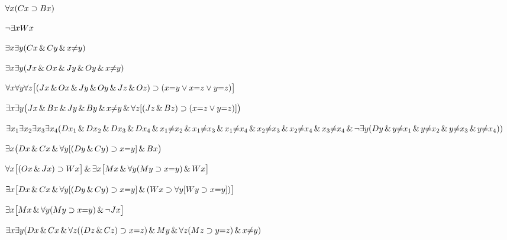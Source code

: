 \begin{earg}
\item %
$\forall x(Cx \supset Bx)$
\item %
$\neg\exists x Wx$
\item %
$\exists x \exists y(Cx \,\&\, Cy \,\&\, x{\neq} y)$
\item %
$\exists x \exists y(Jx \,\&\, Ox \,\&\, Jy \,\&\, Oy \,\&\, x{\neq} y)$
\item %
$\forall x\forall y\forall z\bigl[(Jx \,\&\, Ox \,\&\, Jy \,\&\, Oy \,\&\, Jz \,\&\, Oz)\supset(x{=}y \vee x{=}z \vee y{=}z)\bigr]$
\item %
$\exists x\exists y\bigl(Jx \,\&\, Bx \,\&\, Jy \,\&\, By \,\&\, x {\neq} y\,\&\, \forall z[(Jz \,\&\, Bz) \supset (x{=}z \vee y{=}z)]\bigr)$
\item %
$\exists x_1\exists x_2\exists x_3\exists x_4 (Dx_1 \,\&\, Dx_2 \,\&\, Dx_3 \,\&\, Dx_4 \,\&\, x_1 {\neq} x_2 \,\&\, x_1 {\neq} x_3 \,\&\, x_1 {\neq} x_4 \,\&\, x_2 {\neq} x_3 \,\&\, x_2 {\neq} x_4 \,\&\, x_3 {\neq} x_4 \\  \,\&\, \neg\exists y(Dy \,\&\, y{\neq} x_1 \,\&\, y{\neq}x_2 \,\&\, y{\neq} x_3 \,\&\, y{\neq} x_4))$
\item %
$\exists x\bigl(Dx \,\&\, Cx \,\&\, \forall y[(Dy\,\&\, Cy) \supset x{=}y] \,\&\, Bx\bigr)$
\item %
$\forall x\bigl[(Ox \,\&\, Jx) \supset Wx\bigr] \,\&\, \exists x\bigl[Mx \,\&\, \forall y(My \supset x{=}y) \,\&\, Wx\bigr]$
\item %
$\exists x \bigl[Dx \,\&\, Cx \,\&\, \forall y[(Dy\,\&\, Cy) \supset x{=}y] \,\&\, (Wx \supset \forall y [Wy \supset x{=}y])\bigr]$
\item %
$\exists x\bigl[Mx \,\&\, \forall y(My \supset x{=}y) \,\&\, \neg Jx\bigr]$
\item %
$\exists x \exists y (Dx \,\&\, Cx \,\&\, \forall z((Dz \,\&\, Cz) \supset x{=}z) \,\&\, My \,\&\, \forall z (Mz \supset y{=}z) \,\&\, x{\neq}y)$
\end{earg}



